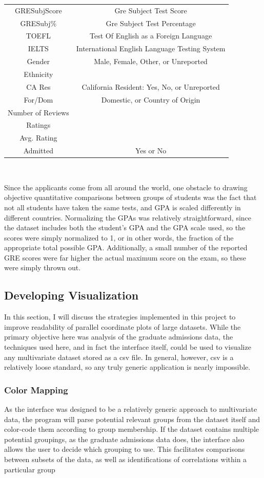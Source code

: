 \documentclass[]{article}
\begin{document}
\begin{tabular}{c|c}
		 GRESubjScore & Gre Subject Test Score\\
		 GRESubj\% & Gre Subject Test Percentage\\
		 TOEFL & Test Of English as a Foreign Language\\
		 IELTS & International English Language Testing System \\
		 Gender & Male, Female, Other, or Unreported\\
		 Ethnicity & \\
		 CA Res & California Resident: Yes, No, or Unreported\\
		 For/Dom & Domestic, or Country of Origin\\
		 Number of Reviews & \\ 
		 Ratings & \\ 
		 Avg. Rating & \\ 
		 Admitted & Yes or No\\
		\end{tabular} \\
		
		\par Since the applicants come from all around the world, one obstacle to drawing objective quantitative comparisons between groups of students was the fact that not all students have taken the same tests, and GPA is scaled differently in different countries. Normalizing the GPAs was relatively straightforward, since the dataset includes both the student's GPA and the GPA scale used, so the scores were simply normalized to 1, or in other words, the fraction of the appropriate total possible GPA. Additionally, a small number of the reported GRE scores were far higher the actual maximum score on the exam\cite{GRE}, so these were simply thrown out.
	\subsection{Developing Visualization}
		\par In this section, I will discuss the strategies implemented in this project to improve readability of parallel coordinate plots of large datasets. While the primary objective here was analysis of the graduate admissions data, the techniques used here, and in fact the interface itself, could be used to visualize any multivariate dataset stored as a csv file. In general, however, csv is a relatively loose standard\cite{csv}, so any truly generic application is nearly impossible.
		\subsubsection{Color Mapping}
			As the interface was designed to be a relatively generic approach to multivariate data, the program will parse potential relevant groups from the dataset itself and color-code them according to group membership. If the dataset contains multiple potential groupings, as the graduate admissions data does, the interface also allows the user to decide which grouping to use. This facilitates comparisons between subsets of the data, as well as identifications of correlations within a particular group
\end{document}
